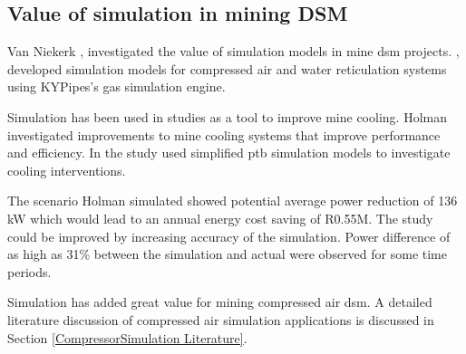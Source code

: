 	\subsection{Value of simulation in mining DSM}
	Van Niekerk \cite{van2013value}, \cite{vanNiekerk2012Value} investigated the value of simulation models in mine \gls{dsm} projects. \cite{van2013value}, \cite{vanNiekerk2012Value} developed simulation models for compressed air and water reticulation systems using KYPipes's gas simulation engine. 
	\par
	Simulation has been used in studies as a tool to improve mine cooling. Holman \cite{Holman2014Masters} investigated improvements to mine cooling systems that improve performance and efficiency. In the study \cite{Holman2014Masters} used simplified \gls{ptb} simulation models to investigate cooling interventions.
	\par 
	The scenario Holman simulated showed potential average power reduction of 136 kW which would lead to an annual energy cost saving of R0.55M. The study could be improved by increasing accuracy of the simulation. Power difference of as high as 31\% between the simulation and actual were observed for some time periods.
	\par
	Simulation has added great value for mining compressed air \gls{dsm}. A detailed literature discussion of compressed air simulation applications is discussed in Section \ref{CompressorSimulation Literature}.
